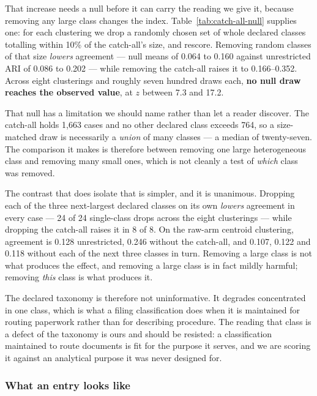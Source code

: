 That increase needs a null before it can carry the reading we give it, because removing any
large class changes the index. Table~\ref{tab:catch-all-null} supplies one: for each clustering
we drop a randomly chosen set of whole declared classes totalling within 10\% of the catch-all's
size, and rescore. Removing random classes of that size \emph{lowers} agreement --- null means
of 0.064 to 0.160 against unrestricted ARI of 0.086 to 0.202 --- while removing the catch-all
raises it to 0.166--0.352. Across eight clusterings and roughly seven hundred draws each,
\textbf{no null draw reaches the observed value}, at $z$ between 7.3 and 17.2.

That null has a limitation we should name rather than let a reader discover. The catch-all holds
1{,}663 cases and no other declared class exceeds 764, so a size-matched draw is necessarily a
\emph{union} of many classes --- a median of twenty-seven. The comparison it makes is therefore
between removing one large heterogeneous class and removing many small ones, which is not
cleanly a test of \emph{which} class was removed.

The contrast that does isolate that is simpler, and it is unanimous. Dropping each of the three
next-largest declared classes on its own \emph{lowers} agreement in every case --- 24 of 24
single-class drops across the eight clusterings --- while dropping the catch-all raises it in
8 of 8. On the raw-arm centroid clustering, agreement is 0.128 unrestricted, 0.246 without the
catch-all, and 0.107, 0.122 and 0.118 without each of the next three classes in turn. Removing a
large class is not what produces the effect, and removing a large class is in fact mildly
harmful; removing \emph{this} class is what produces it.

The declared taxonomy is therefore not uninformative. It degrades concentrated in one class,
which is what a filing classification does when it is maintained for routing paperwork rather
than for describing procedure. The reading that class is a defect of the taxonomy is ours and
should be resisted: a classification maintained to route documents is fit for the purpose it
serves, and we are scoring it against an analytical purpose it was never designed for.



\subsubsection{What an entry looks like}

